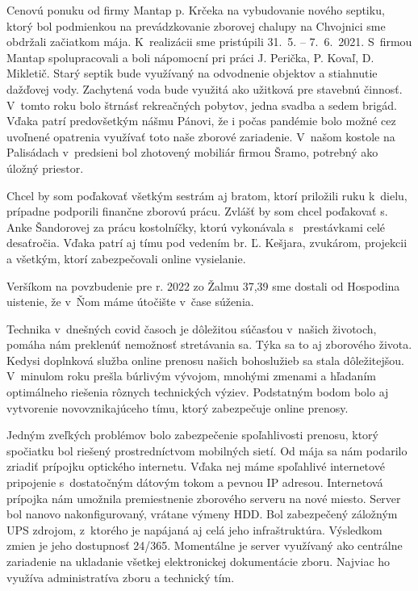 Cenovú ponuku od firmy Mantap p. Krčeka na vybudovanie nového septiku, ktorý bol podmienkou na prevádzkovanie zborovej chalupy na Chvojnici sme obdržali začiatkom mája. K~realizácii sme pristúpili 31.~5. -- 7.~6.~2021. S~firmou Mantap spolupracovali a boli nápomocní pri práci J. Perička, P. Kovaľ, D. Mikletič. Starý septik bude využívaný na odvodnenie objektov a stiahnutie dažďovej vody. Zachytená voda bude využitá ako užitková pre stavebnú činnosť. V~tomto roku bolo štrnásť rekreačných pobytov, jedna svadba a sedem brigád. Vďaka patrí predovšetkým nášmu Pánovi, že i počas pandémie bolo možné cez uvoľnené opatrenia využívať toto naše zborové zariadenie.
V~našom kostole na Palisádach v~predsieni bol zhotovený mobiliár firmou Šramo, potrebný ako úložný priestor. 

Chcel by som poďakovať všetkým sestrám aj bratom, ktorí priložili ruku k~dielu, prípadne podporili finančne zborovú prácu. Zvlášť by som chcel poďakovať s. Anke Šandorovej za prácu kostolníčky, ktorú vykonávala s~ prestávkami celé desaťročia. Vďaka patrí aj tímu pod vedením br. Ľ. Kešjara, zvukárom, projekcii a všetkým, ktorí zabezpečovali online vysielanie.

Veršíkom na povzbudenie pre r. 2022 zo Žalmu 37,39 sme dostali od Hospodina uistenie, že v~Ňom máme útočište v~čase súženia.



Technika v~dnešných covid časoch je dôležitou súčasťou v~našich životoch, pomáha nám preklenúť nemožnosť stretávania sa. Týka sa to aj zborového života. Kedysi doplnková služba online prenosu našich bohoslužieb sa stala dôležitejšou. V~minulom roku prešla búrlivým vývojom, mnohými zmenami a hľadaním optimálneho riešenia rôznych technických výziev. Podstatným bodom bolo aj vytvorenie novovznikajúceho tímu, ktorý zabezpečuje online prenosy.

Jedným zveľkých problémov bolo zabezpečenie spoľahlivosti prenosu, ktorý spočiatku bol riešený prostredníctvom mobilných sietí. Od mája sa nám podarilo zriadiť prípojku optického internetu. Vďaka nej máme spoľahlivé internetové pripojenie s~dostatočným dátovým tokom a pevnou IP adresou. 
Internetová prípojka nám umožnila premiestnenie zborového serveru na nové miesto. Server bol nanovo nakonfigurovaný, vrátane výmeny HDD. Bol zabezpečený záložným UPS zdrojom, z~ktorého je napájaná aj celá jeho infraštruktúra. Výsledkom zmien je jeho dostupnosť 24/365. Momentálne je server využívaný ako centrálne zariadenie na ukladanie všetkej elektronickej dokumentácie zboru. Najviac ho využíva administratíva zboru a technický tím.

